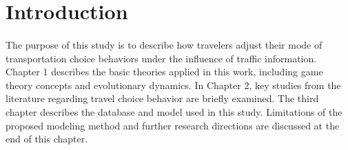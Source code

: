 

\section*{Introduction}

\paragraph{}The purpose of this study is to describe how travelers adjust their mode of transportation choice behaviors under the influence of traffic information. Chapter 1 describes the basic theories applied in this work, including game theory concepts and evolutionary dynamics. In Chapter 2, key studies from the literature regarding travel choice behavior are briefly examined. The third chapter describes the database and model used in this study. Limitations of the proposed modeling method and further research directions are discussed at the end of this chapter. 
